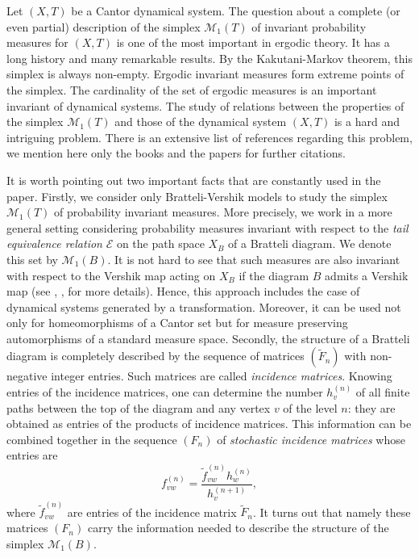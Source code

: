 \documentclass[11pt, english, reqno]{amsart}
\theoremstyle{definition}
\theoremstyle{remark}
\theoremstyle{plain}
\def\tl{\widetilde}
\numberwithin{equation}{section}
\begin{document}
Let $(X, T)$ be a Cantor dynamical system. The question about a complete
 (or even partial) description of the simplex
$\mathcal{M}_1(T)$ of invariant probability measures for  $(X, T)$ is
one of the most important in ergodic theory. It has
a long history and many remarkable results. By the Kakutani-Markov
 theorem,
this simplex is always non-empty. Ergodic invariant measures form extreme
points of the simplex. The cardinality of the set of ergodic measures is an
important invariant of dynamical systems. The study of relations
 between the properties  of the simplex $\mathcal{M}_1(T)$ and those of
  the  dynamical system $(X,T)$ is a hard and intriguing problem. There is
an extensive list of references regarding this problem, we mention here only
 the books  \cite{Phelps2001, Glasner2003} and the papers
  \cite{Downarowicz1991,  Downarowicz2006, Downarowicz2008} for
  further  citations.

It is worth  pointing  out two important facts that are constantly used in
the paper. Firstly, we consider only  Bratteli-Vershik models to study  the
simplex $\mathcal{M}_1(T)$ of probability invariant measures. More
precisely, we work  in a more general setting considering
probability measures invariant with respect to the
\textit{tail equivalence relation} $\mathcal E$ on the path space $X_B$ of
a Bratteli diagram. We denote this set by $\mathcal{M}_1(B)$. It is not
hard to see that such measures are also invariant with
respect to the Vershik map acting on $X_B$ 
\cite{BezuglyiKwiatkowskiMedynetsSolomyak2010} if the diagram $B$ 
admits a Vershik map (see \cite{Medynets2007}, 
\cite{BezuglyiKwiatkowskiYassawi2014}, \cite{BezuglyiYassawi2017} for 
more details). Hence,  this approach
includes the case of dynamical systems generated by a transformation.
Moreover, it can be used  not only for homeomorphisms of  a Cantor set
but for measure preserving automorphisms of a standard measure space.
Secondly, the structure of a Bratteli diagram is completely described by the 
 sequence of matrices $(\tl F_n)$
 with non-negative integer entries. Such matrices are called \textit{incidence
 matrices}. Knowing entries of the incidence matrices, one can determine
 the number $h^{(n)}_v$ of all finite paths between the top of the diagram
 and any vertex $v$ of the level $n$: they are obtained as entries of
  the products of  incidence matrices. This information can be combined
together in the sequence $(F_n)$  of \textit{stochastic incidence matrices}
whose entries are
  $$
  f_{vw}^{(n)} = \frac{\tl f_{vw}^{(n)} h^{(n)}_w} {h^{(n+1)}_v},
  $$
  where $\tl f_{vw}^{(n)}$ are entries of the incidence matrix
  $\tl F_n$.
It turns out that namely these matrices $(F_n)$  carry the information
needed to describe the structure of the  simplex $\mathcal{M}_1(B)$.
\end{document}

